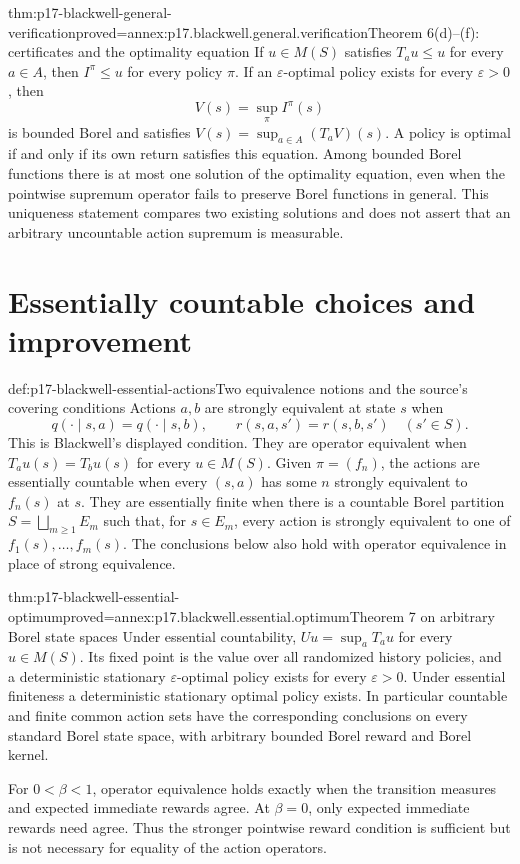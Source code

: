 \begin{hbtheorem}{thm:p17-blackwell-general-verification}{proved=annex:p17.blackwell.general.verification}{Theorem 6(d)--(f): certificates and the optimality equation}
If \(u\in M(S)\) satisfies \(T_a u\leq u\) for every \(a\in A\),
then \(I^\pi\leq u\) for every policy \(\pi\).
If an \(\varepsilon\)-optimal policy exists for every
\(\varepsilon>0\), then
\[
 V(s)=\sup_\pi I^\pi(s)
\]
is bounded Borel and satisfies \(V(s)=\sup_{a\in A}(T_aV)(s)\).
A policy is optimal if and only if its own return satisfies this
equation. Among bounded Borel functions there is at most one
solution of the optimality equation, even when the pointwise
supremum operator fails to preserve Borel functions in general.
This uniqueness statement compares two existing solutions and
does not assert that an arbitrary uncountable action supremum
is measurable.
\end{hbtheorem}

\section{Essentially countable choices and improvement}

\begin{hbdefinition}{def:p17-blackwell-essential-actions}{Two equivalence notions and the source's covering conditions}
Actions \(a,b\) are strongly equivalent at state \(s\) when
\[
 q(\cdot\mid s,a)=q(\cdot\mid s,b),\qquad
 r(s,a,s')=r(s,b,s')\quad(s'\in S).
\]
This is Blackwell's displayed condition.
They are operator equivalent when \(T_au(s)=T_bu(s)\)
for every \(u\in M(S)\).
Given \(\pi=(f_n)\), the actions are essentially countable
when every \((s,a)\) has some \(n\) strongly equivalent to
\(f_n(s)\) at \(s\).
They are essentially finite when there is a countable Borel
partition \(S=\bigsqcup_{m\geq1}E_m\) such that, for
\(s\in E_m\), every action is strongly equivalent to one of
\(f_1(s),\ldots,f_m(s)\).
The conclusions below also hold with operator equivalence
in place of strong equivalence.
\end{hbdefinition}

\begin{hbtheorem}{thm:p17-blackwell-essential-optimum}{proved=annex:p17.blackwell.essential.optimum}{Theorem 7 on arbitrary Borel state spaces}
Under essential countability, \(Uu=\sup_aT_au\) for every
\(u\in M(S)\). Its fixed point is the value over all randomized
history policies, and a deterministic stationary
\(\varepsilon\)-optimal policy exists for every \(\varepsilon>0\).
Under essential finiteness a deterministic stationary optimal
policy exists. In particular countable and finite common action
sets have the corresponding conclusions on every standard Borel
state space, with arbitrary bounded Borel reward and Borel kernel.

For \(0<\beta<1\), operator equivalence holds exactly when
the transition measures and expected immediate rewards agree.
At \(\beta=0\), only expected immediate rewards need agree.
Thus the stronger pointwise reward condition is sufficient
but is not necessary for equality of the action operators.
\end{hbtheorem}


